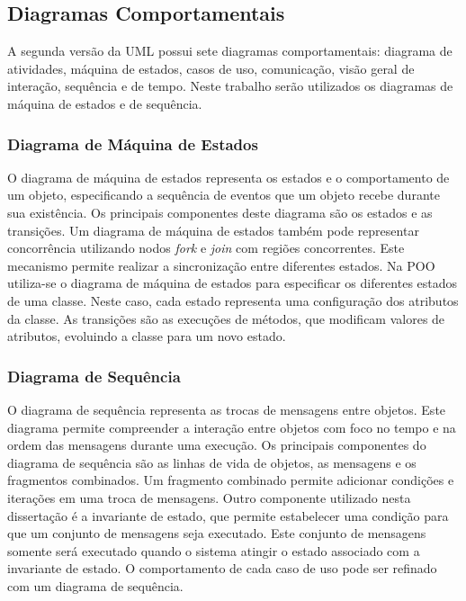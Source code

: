\subsection{Diagramas Comportamentais}

A segunda versão da UML possui sete diagramas comportamentais: diagrama de atividades, máquina de estados, casos de uso, comunicação, visão geral de 
interação, sequência e de tempo. Neste trabalho serão utilizados os diagramas de máquina de estados e de sequência.

\subsubsection{Diagrama de Máquina de Estados}

O diagrama de máquina de estados representa os estados e o comportamento de um objeto, especificando a sequência de eventos que um objeto recebe
durante sua existência. Os principais componentes deste diagrama são os estados e as transições. Um diagrama de máquina de estados também pode
representar concorrência utilizando nodos \textit{fork} e \textit{join} com regiões concorrentes. Este mecanismo permite realizar a sincronização
entre diferentes estados. Na POO utiliza-se o diagrama de máquina de estados para especificar os diferentes estados de uma classe.
Neste caso, cada estado representa uma configuração dos atributos da classe. As transições são as execuções de métodos, que modificam valores de
atributos, evoluindo a classe para um novo estado.

\subsubsection{Diagrama de Sequência}

O diagrama de sequência representa as trocas de mensagens entre objetos. Este diagrama permite compreender a interação entre objetos com
foco no tempo e na ordem das mensagens durante uma execução. Os principais componentes do diagrama de sequência são as linhas de vida de objetos, as
mensagens e os fragmentos combinados. Um fragmento combinado permite adicionar condições e iterações em uma troca de mensagens. Outro componente
utilizado nesta dissertação é a invariante de estado, que permite estabelecer uma condição para que um conjunto de mensagens seja executado. Este conjunto de mensagens somente será executado quando o sistema atingir o estado associado com a invariante de estado. O comportamento
de cada caso de uso pode ser refinado com um diagrama de sequência.

